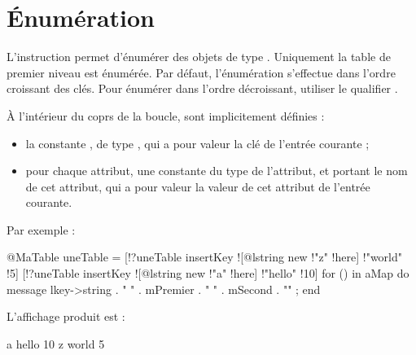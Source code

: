 \section{Énumération}

L'instruction  permet d'énumérer des objets de type . Uniquement la table de premier niveau est énumérée. Par défaut, l'énumération s'effectue dans l'ordre croissant des clés. Pour énumérer dans l'ordre décroissant, utiliser le qualifier \galgas{>}.

À l'intérieur du coprs de la boucle, sont implicitement définies :
\begin{itemize}
  \item la constante , de type , qui a pour valeur la clé de l'entrée courante ;
  \item pour chaque attribut, une constante du type de l'attribut, et portant le nom de cet attribut, qui a pour valeur la valeur de cet attribut de l'entrée courante.
\end{itemize}

Par exemple :
\begin{galgascode}
@MaTable uneTable = {}
[!?uneTable insertKey ![@lstring new !"z" !here] !"world" !5]
[!?uneTable insertKey ![@lstring new !"a" !here] !"hello" !10]
for () in aMap do
  message lkey->string . " " . mPremier . " " . mSecond . "\n" ;
end
\end{galgascode}

L'affichage produit est :

\begin{galgascode}
a hello 10
z world 5
\end{galgascode}

